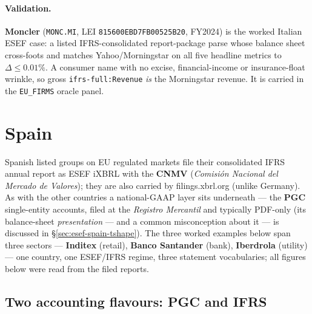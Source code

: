 \documentclass[11pt,a4paper]{report}
\begin{document}
\paragraph{Validation.} \textbf{Moncler} (\texttt{MONC.MI}, LEI \texttt{815600EBD7FB00525B20}, FY2024) is the
worked Italian ESEF case: a listed IFRS-consolidated report-package parse whose balance sheet cross-foots and
matches Yahoo/Morningstar on all five headline metrics to \(\Delta\le 0.01\%\). A consumer name with no excise,
financial-income or insurance-float wrinkle, so gross \texttt{ifrs-full:Revenue} \emph{is} the Morningstar
revenue. It is carried in the \texttt{EU\_FIRMS} oracle panel.

\section{Spain}
\label{sec:esef-spain}

Spanish listed groups on EU regulated markets file their consolidated IFRS annual report as ESEF iXBRL with
the \textbf{CNMV} (\emph{Comisión Nacional del Mercado de Valores}); they are also carried by
filings.xbrl.org (unlike Germany). As with the other countries a national-GAAP layer sits underneath --- the
\textbf{PGC} single-entity accounts, filed at the \emph{Registro Mercantil} and typically PDF-only (its
balance-sheet \emph{presentation} --- and a common misconception about it --- is discussed in
\S\ref{sec:esef-spain-tshape}). The three worked examples below span three sectors --- \textbf{Inditex}
(retail), \textbf{Banco Santander} (bank), \textbf{Iberdrola} (utility) --- one country, one ESEF/IFRS
regime, three statement vocabularies; all figures below were read from the filed reports.

\subsection{Two accounting flavours: PGC and IFRS}
\end{document}
